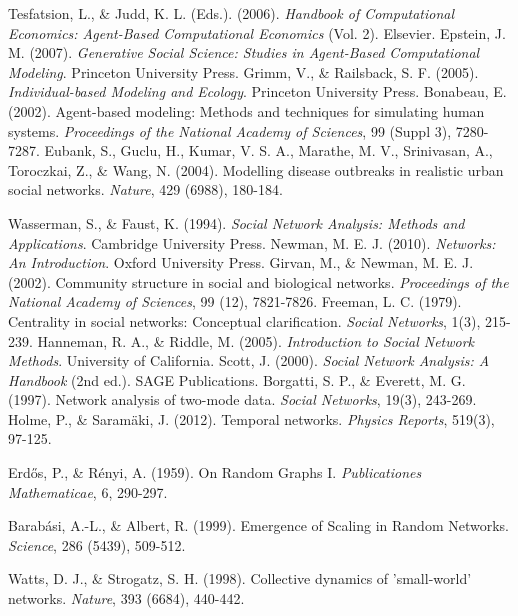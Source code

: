  Tesfatsion, L., \& Judd, K. L. (Eds.). (2006). \textit{Handbook of Computational Economics: Agent-Based Computational Economics} (Vol. 2). Elsevier.
 Epstein, J. M. (2007). \textit{Generative Social Science: Studies in Agent-Based Computational Modeling}. Princeton University Press.
 Grimm, V., \& Railsback, S. F. (2005). \textit{Individual-based Modeling and Ecology}. Princeton University Press.
 Bonabeau, E. (2002). Agent-based modeling: Methods and techniques for simulating human systems. \textit{Proceedings of the National Academy of Sciences}, 99 (Suppl 3), 7280-7287.
 Eubank, S., Guclu, H., Kumar, V. S. A., Marathe, M. V., Srinivasan, A., Toroczkai, Z., \& Wang, N. (2004). Modelling disease outbreaks in realistic urban social networks. \textit{Nature}, 429 (6988), 180-184.

 Wasserman, S., \& Faust, K. (1994). \textit{Social Network Analysis: Methods and Applications}. Cambridge University Press.
 Newman, M. E. J. (2010). \textit{Networks: An Introduction}. Oxford University Press.
 Girvan, M., \& Newman, M. E. J. (2002). Community structure in social and biological networks. \textit{Proceedings of the National Academy of Sciences}, 99 (12), 7821-7826.
 Freeman, L. C. (1979). Centrality in social networks: Conceptual clarification. \textit{Social Networks}, 1(3), 215-239.
 Hanneman, R. A., \& Riddle, M. (2005). \textit{Introduction to Social Network Methods}. University of California.
 Scott, J. (2000). \textit{Social Network Analysis: A Handbook} (2nd ed.). SAGE Publications.
 Borgatti, S. P., \& Everett, M. G. (1997). Network analysis of two-mode data. \textit{Social Networks}, 19(3), 243-269.
 Holme, P., \& Saramäki, J. (2012). Temporal networks. \textit{Physics Reports}, 519(3), 97-125.

 Erdős, P., \& Rényi, A. (1959). On Random Graphs I. \textit{Publicationes Mathematicae}, 6, 290-297.

 Barabási, A.-L., \& Albert, R. (1999). Emergence of Scaling in Random Networks. \textit{Science}, 286 (5439), 509-512.

 Watts, D. J., \& Strogatz, S. H. (1998). Collective dynamics of 'small-world' networks. \textit{Nature}, 393 (6684), 440-442.


